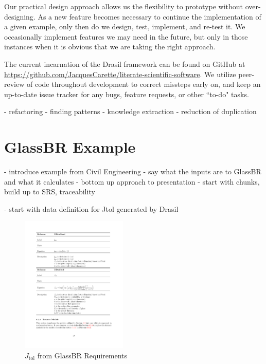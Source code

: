 \documentclass[sigconf]{acmart}
\begin{document}
Our practical design approach allows us the flexibility to prototype without 
over-designing. As a new feature becomes necessary to continue the 
implementation of a given example, only then do we design, test, implement, and 
re-test it. We occasionally implement features we may need in the future, but 
only in those instances when it is obvious that we are taking the right approach.

The current incarnation of the Drasil framework can be found on GitHub at 
\href{https://github.com/JacquesCarette/literate-scientific-software}
{https://github.com/JacquesCarette/literate-scientific-software}. We utilize 
peer-review of code throughout development to correct missteps early on, and 
keep an up-to-date issue tracker for any bugs, feature requests, or other 
``to-do" tasks.

- refactoring - finding patterns
- knowledge extraction
- reduction of duplication


\section{GlassBR Example} \label{SecGlassBR}

- introduce example from Civil Engineering - say what the inputs are to GlassBR
and what it calculates
- bottom up approach to presentation - start with chunks, build up to SRS, traceability

- start with data definition for Jtol generated by Drasil

\begin{figure}[htpb]
\begin{center}
\includegraphics[width=0.45\textwidth]{./figures/Jtol_pdf.pdf}
\end{center}
\caption{$J_{\mbox{tol}}$ from GlassBR Requirements}
\label{Fig_Jtolpdf}
\end{figure}
\end{document}
